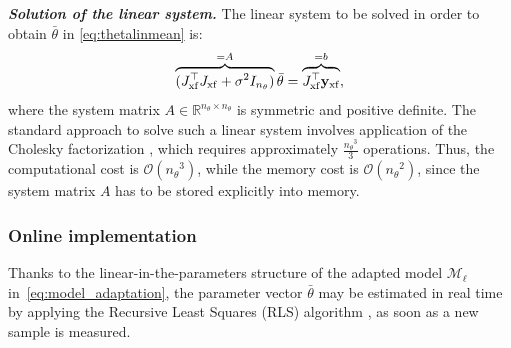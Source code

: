 \documentclass{article}
\newcommand{\nsamp}{{N}}
\newcommand{\npar}{{n_\theta}}
\newcommand{\M}{\mathcal{M}}
\newcommand{\R}{{\mathbb{R}}}
\newcommand{\transf}{{\rm{xf}}}
\newcommand{\lin}{{\ell}}
\newcommand{\tvec}[1]{{\mathbf{#1}}}
\begin{document}
\noindent \textbf{\emph{Solution of the linear system.}}
The linear system to be solved in order to obtain $\bar{\theta}$ in \eqref{eq:thetalinmean} is:
\begin{equation}
\label{eq:linear_system}
\overbrace{(J^\top_\transf J_\transf + \sigma^2 I_\npar)}^{=A}\bar{\theta} = \overbrace{J^\top_\transf \tvec{y}_\transf}^{=b},
\end{equation}
where the system matrix $A \in \R^{\npar \times \npar}$ is symmetric and positive definite.
The standard approach to solve such a linear system involves application of the Cholesky factorization \cite[Appendix~A]{nocedal2006numerical}, which requires approximately $\frac{\npar^3}{3}$ operations. 
Thus, the computational cost is $\mathcal{O}(\npar^3)$, while the memory cost is $\mathcal{O}(\npar^2)$, since the system matrix $A$ has to be stored explicitly into memory. 


\subsubsection{Online implementation}
Thanks to  the linear-in-the-parameters structure of the adapted model $\M_\lin$
 in~\eqref{eq:model_adaptation},  the parameter vector $\bar{\theta}$ may be estimated in real time by applying the Recursive Least Squares (RLS) algorithm \cite[Chapter~11]{ljung:1999system}, as soon
as a new sample is measured.
\end{document}
